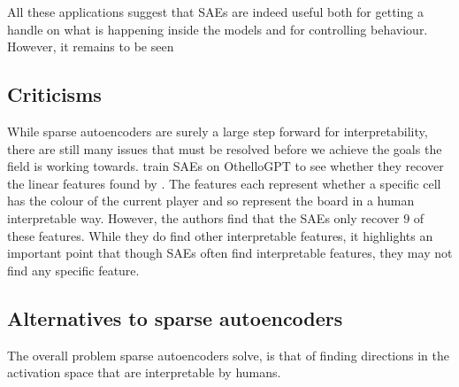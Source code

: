 \documentclass[../../main.tex]{subfiles}
\begin{document}
All these applications suggest that SAEs are indeed useful both for getting a handle on what is happening inside the models and for controlling behaviour.
However, it remains to be seen 



\subsection{Criticisms}
While sparse autoencoders are surely a large step forward for interpretability, there are still many issues that must be resolved before we achieve the goals the field is working towards.
\citet{robert_aizi_research_2024} train SAEs on OthelloGPT \citep{li_emergent_2023} to see whether they recover the linear features found by \citet{neel_nanda_actually_2023}.
The features each represent whether a specific cell has the colour of the current player and so represent the board in a human interpretable way.
However, the authors find that the SAEs only recover $9$ of these features.
While they do find other interpretable features, it highlights an important point that though SAEs often find interpretable features, they may not find any specific feature.



\subsection{Alternatives to sparse autoencoders}\label{sec:alternatives_to_saes}
The overall problem sparse autoencoders solve, is that of finding directions in the activation space that are interpretable by humans.



\end{document}
